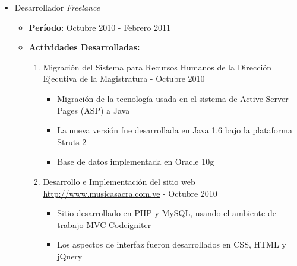 \documentclass[letterpaper,12pt]{report}
\begin{document}
\begin{itemize}
        \item{Desarrollador \emph{Freelance}}
        \begin{itemize}
        \item{\textbf{Período}: Octubre 2010 - Febrero 2011}
        \item{\textbf{Actividades Desarrolladas:}}
            \begin{enumerate}
            \item Migración del Sistema para Recursos Humanos de la Dirección Ejecutiva de la Magis\-tratura - Octubre 2010
	            \begin{itemize}
	            \item Migración de la tecnología usada en el sistema de Active Server Pages (ASP) a Java
	            \item La nueva versión fue desarrollada en Java 1.6 bajo la plataforma Struts 2
	            \item Base de datos implementada en Oracle 10g
	            \end{itemize}
            \item Desarrollo e Implementación del sitio web \url{http://www.musicasacra.com.ve} - Octubre 2010
	            \begin{itemize}
		            \item Sitio desarrollado en PHP y MySQL, usando el ambiente de trabajo MVC Codeigniter
		            \item Los aspectos de interfaz fueron desarrollados en CSS, HTML y jQuery
	            \end{itemize}
            \end{enumerate}
        \end{itemize}


\end{itemize}
\end{document}

